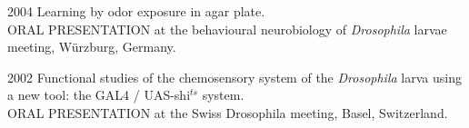 \begin{itemize}
\begin{sloppypar}

\item[2004]
Learning by odor exposure in agar plate.
\\ORAL PRESENTATION at the
behavioural neurobiology of \textit{Drosophila} larvae meeting, W\"{u}rzburg,
Germany.


\item[2002]
Functional studies of the chemosensory system of the
\textit{Drosophila} larva  using a new tool: the GAL4 / UAS-shi$^{ts}$ system.
\\ORAL PRESENTATION at the Swiss Drosophila meeting, Basel, Switzerland.


\end{sloppypar}
\end{itemize}





